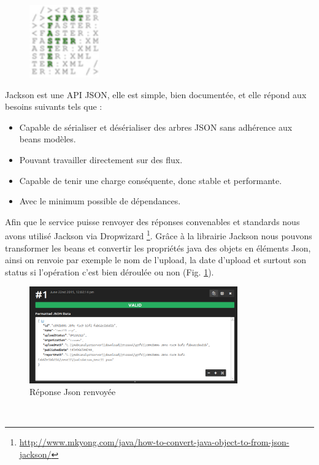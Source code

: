 \begin{itemize}
\begin{figure}
\centering
\includegraphics[width=3cm]{images/fxml_logo_Jackson.png}
\end{figure}
\noindent Jackson est une API JSON, elle est simple, bien documentée, et elle répond aux besoins suivants tels que :
\begin{itemize}
\item Capable de sérialiser et désérialiser des arbres JSON sans adhérence aux beans modèles.
\item Pouvant travailler directement sur des flux.
\item Capable de tenir une charge conséquente, donc stable et performante.
\item Avec le minimum possible de dépendances.
\end{itemize}

Afin que le service puisse renvoyer des réponses convenables et standards nous avons utilisé Jackson via Dropwizard \footnote{\url{http://www.mkyong.com/java/how-to-convert-java-object-to-from-json-jackson/}}. Grâce à la librairie Jackson nous pouvons transformer les \og beans \fg et convertir les propriétés java des objets en éléments Json, ainsi on renvoie par exemple le nom de l'upload, la date d'upload et surtout son status si l'opération c'est bien déroulée ou non (Fig. \ref{fig:Json1}).
\\
\begin{figure}[h]
	\centering
		\includegraphics[width=0.8\textwidth]{images/JsonFormatter_serialization.PNG}
	\caption{Réponse Json renvoyée}
	\label{fig:Json1}
\end{figure}\\


\end{itemize}
